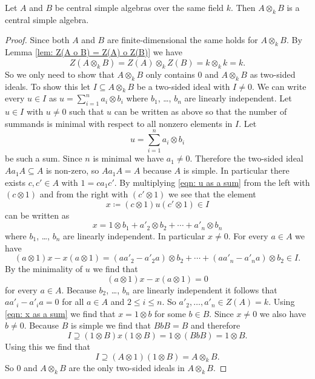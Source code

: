 \begin{lem}
 Let $A$ and $B$ be central simple algebras over the same field $k$. Then $A \otimes_k B$ is a central simple algebra.
\end{lem}
\begin{proof}
 Since both $A$ and $B$ are finite-dimensional the same holds for $A \otimes_k B$. By Lemma \ref{lem: Z(A o B) = Z(A) o Z(B)} we have
 \[
  Z(A \otimes_k B) = Z(A) \otimes_k Z(B) = k \otimes_k k = k.
 \]
 So we only need to show that $A \otimes_k B$ only contains $0$ and $A \otimes_k B$ as two-sided ideals. To show this let $I \subseteq A \otimes_k B$ be a two-sided ideal with $I \neq 0$. We can write every $u \in I$ as $u = \sum_{i=1}^n a_i \otimes b_i$ where $b_1$, \dots, $b_n$ are linearly independent. Let $u \in I$ with $u \neq 0$ such that $u$ can be written as above so that the number of summands is minimal with respect to all nonzero elements in $I$. Let
 \begin{equation}\label{eqn: u as a sum}
  u = \sum_{i=1}^n a_i \otimes b_i
 \end{equation}
 be such a sum. Since $n$ is minimal we have $a_1 \neq 0$. Therefore the two-sided ideal $A a_1 A \subseteq A$ is non-zero, so $A a_1 A = A$ because $A$ is simple. In particular there exists $c, c' \in A$ with $1 = c a_1 c'$. By multiplying \eqref{eqn: u as a sum} from the left with $(c \otimes 1)$ and from the right with $(c' \otimes 1)$ we see that the element
 \[
  x \coloneqq (c \otimes 1) u (c' \otimes 1) \in I
 \]
 can be written as
 \begin{equation}\label{eqn: x as a sum}
  x = 1 \otimes b_1 + a'_2 \otimes b_2 + \dotsb + a'_n \otimes b_n
 \end{equation}
 where $b_1$, \dots, $b_n$ are linearly independent. In particular $x \neq 0$. For every $a \in A$ we have
 \[
  (a \otimes 1) x - x (a \otimes 1)
  = (a a'_2 - a'_2 a) \otimes b_2 + \dotsb + (a a'_n - a'_n a) \otimes b_2 \in I.
 \]
 By the minimality of $u$ we find that
 \[
  (a \otimes 1) x - x (a \otimes 1) = 0
 \]
 for every $a \in A$. Because $b_2$, \dots, $b_n$ are linearly independent it follows that $a a'_i - a'_i a = 0$ for all $a \in A$ and $2 \leq i \leq n$. So $a'_2, \dotsc, a'_n \in Z(A) = k$. Using \eqref{eqn: x as a sum} we find that $x = 1 \otimes b$ for some $b \in B$. Since $x \neq 0$ we also have $b \neq 0$. Because $B$ is simple we find that $BbB = B$ and therefore
 \[
  I \supseteq (1 \otimes B) x (1 \otimes B) = 1 \otimes (BbB) = 1 \otimes B.
 \]
 Using this we find that
 \[
  I \supseteq (A \otimes 1) (1 \otimes B) = A \otimes_k B.
 \]
 So $0$ and $A \otimes_k B$ are the only two-sided ideals in $A \otimes_k B$.
\end{proof}





